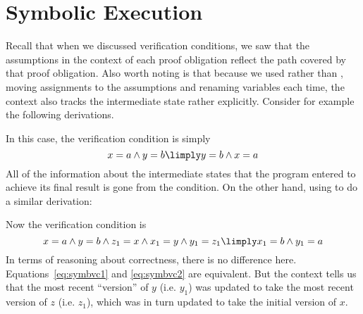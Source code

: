 \documentclass[11pt,twoside]{scrartcl}
\begin{document}
\section{Symbolic Execution}

Recall that when we discussed verification conditions, we saw that the assumptions in the context of each proof obligation reflect the path covered by that proof obligation. Also worth noting is that because we used  rather than , moving assignments to the assumptions and renaming variables each time, the context also tracks the intermediate state rather explicitly. Consider for example the following derivations.
\begin{sequentdeduction}[array]
 {
   {}
}
\end{sequentdeduction}
In this case, the verification condition is simply 
\begin{equation}
\label{eq:symbvc1}
x=a\land y=b \limply y=b \land x=a
\end{equation} 
All of the information about the intermediate states that the program entered to achieve its final result is gone from the condition. On the other hand, using  to do a similar derivation:
\begin{sequentdeduction}
 {
   {}
}
\end{sequentdeduction}
Now the verification condition is
\begin{equation}
\label{eq:symbvc2}
x=a \land y=b \land z_1=x \land x_1 = y \land y_1=z_1 \limply x_1=b \land y_1=a
\end{equation}
In terms of reasoning about correctness, there is no difference here. Equations~\ref{eq:symbvc1} and \ref{eq:symbvc2} are equivalent. But the context tells us that the most recent ``version'' of $y$ (i.e. $y_1$) was updated to take the most recent version of $z$ (i.e. $z_1$), which was in turn updated to take the initial version of $x$.
\end{document}
